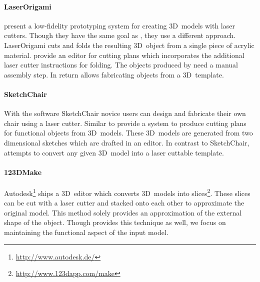 \documentclass[../ClassicThesis.tex]{subfiles}
\begin{document}
\paragraph{LaserOrigami} \citet{laserorigami} present a
low-fidelity prototyping system for creating 3D~models with laser
cutters. Though they have the same goal as {\platener}, they use a
different approach. LaserOrigami cuts and folds the resulting
3D~object from a single piece of acrylic material.
\citeauthor{laserorigami} provide an editor for cutting plans which
incorporates the additional laser cutter instructions for folding. The
objects produced by {\platener} need a manual assembly step. In return
{\platener} allows fabricating objects from a 3D~template.

\paragraph{SketchChair} With the software SketchChair novice users can
design and fabricate their own chair using a laser cutter. Similar to
{\platener} \citet{sketchchair} provide a system to produce
cutting plans for functional objects from 3D~models. These 3D~models
are generated from two dimensional sketches which are drafted in an
editor. In contrast to SketchChair, {\platener} attempts to convert
any given 3D~model into a laser cuttable template.

\paragraph{123DMake} Autodesk\footnote{\url{http://www.autodesk.de/}}
ships a 3D~editor which converts 3D~models into slices\footnote{\url{http://www.123dapp.com/make}}. These slices
can be cut with a laser cutter and stacked onto each other to
approximate the original model. This method solely provides an
approximation of the external shape of the object. Though {\platener}
provides this technique as well, we focus on maintaining the
functional aspect of the input model.
\end{document}
